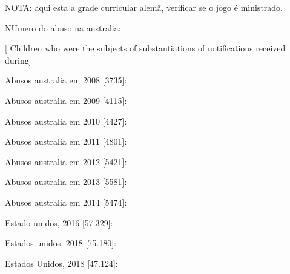 NOTA: aqui esta a grade curricular alemã, verificar se o jogo é ministrado.

NUmero do abuso na australia:



[ Children who were the subjects of substantiations of notifications received during]

Abusos australia em 2008 [3735]: %

Abusos australia em 2009 [4115]: %

Abusos australia em 2010 [4427]: %

Abusos australia em 2011 [4801]: %

Abusos australia em 2012 [5421]: %

Abusos australia em 2013 [5581]: %

Abusos australia em 2014 [5474]: %


Estado unidos, 2016 [57.329]: %

Estados unidos, 2018 [75.180]: %

Estados Unidos, 2018 [47.124]: %



